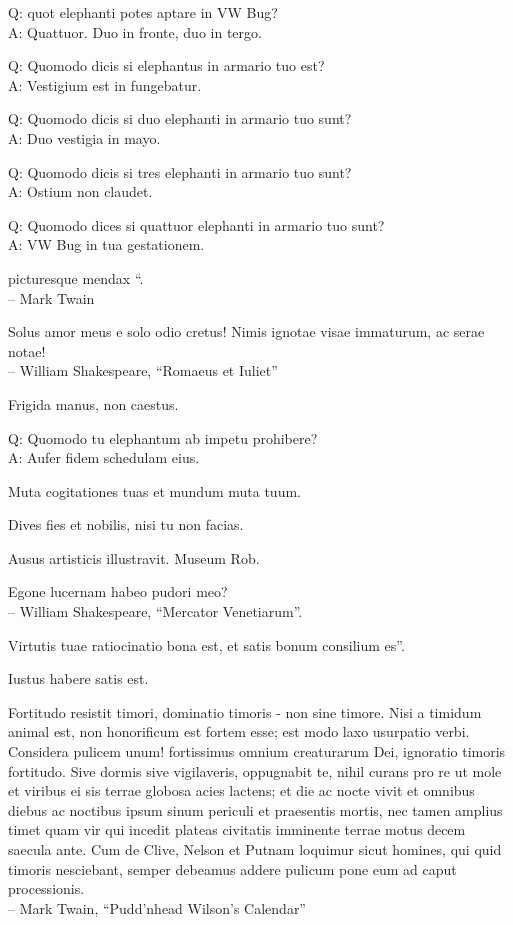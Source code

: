 \documentclass[titlepage,12pt]{memoir}
\begin{document}
Q: quot elephanti potes aptare in VW Bug?\\
A: Quattuor. Duo in fronte, duo in tergo.

Q: Quomodo dicis si elephantus in armario tuo est?\\
A: Vestigium est in fungebatur.

Q: Quomodo dicis si duo elephanti in armario tuo sunt?\\
A: Duo vestigia in mayo.

Q: Quomodo dicis si tres elephanti in armario tuo sunt?\\
A: Ostium non claudet.

Q: Quomodo dices si quattuor elephanti in armario tuo sunt?\\
A: VW Bug in tua gestationem.

picturesque mendax “.
\\-- Mark Twain

Solus amor meus e solo odio cretus!
Nimis ignotae visae immaturum, ac serae notae!
\\-- William Shakespeare, “Romaeus et Iuliet”

Frigida manus, non caestus.

Q: Quomodo tu elephantum ab impetu prohibere?\\
A: Aufer fidem schedulam eius.

Muta cogitationes tuas et mundum muta tuum.

 Dives fies et nobilis, nisi tu non facias.

Ausus artisticis illustravit. Museum Rob.

Egone lucernam habeo pudori meo?
\\-- William Shakespeare, “Mercator Venetiarum”.

Virtutis tuae ratiocinatio bona est, et satis bonum consilium es”.

Iustus habere satis est.

Fortitudo resistit timori, dominatio timoris - non sine timore. Nisi a
timidum animal est, non honorificum est fortem esse; est modo
laxo usurpatio verbi. Considera pulicem unum!
fortissimus omnium creaturarum Dei, ignoratio timoris fortitudo.
Sive dormis sive vigilaveris, oppugnabit te, nihil curans pro re
ut mole et viribus ei sis terrae globosa acies
lactens; et die ac nocte vivit et omnibus diebus ac noctibus
ipsum sinum periculi et praesentis mortis, nec tamen amplius
timet quam vir qui incedit plateas civitatis imminente
terrae motus decem saecula ante. Cum de Clive, Nelson et Putnam loquimur
sicut homines, qui quid timoris nesciebant, semper debeamus addere pulicum
pone eum ad caput processionis.
\\-- Mark Twain, “Pudd’nhead Wilson’s Calendar”
\end{document}
